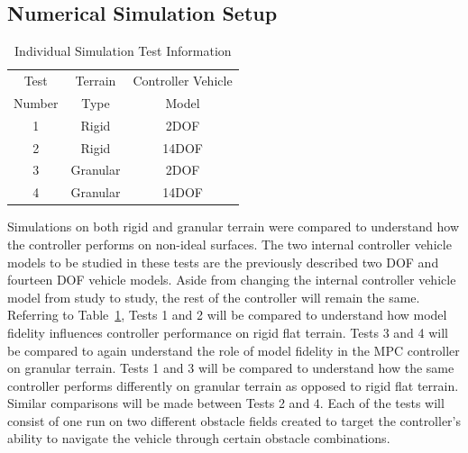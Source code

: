 \documentclass[12pt,twocolumn]{article}
\begin{document}

\subsection{Numerical Simulation Setup }\label{ss:Setup}

\begin{table}
\begin{center}
	\begin{tabular}{||c |c | c||} 
		\hline
		Test  & Terrain  & Controller Vehicle \\
		Number &  Type & Model\\ [0.5ex] 	
		\hline\hline
		1 & Rigid & 2DOF \\ 
		\hline
		2 & Rigid & 14DOF \\
		\hline
		3 & Granular & 2DOF \\
		\hline
		4 & Granular & 14DOF \\
		\hline
	\end{tabular}
\end{center}
\caption{Individual Simulation Test Information}
\label{t:TestMatrix}
\end{table}

Simulations on both rigid and granular terrain were compared to understand how the controller performs on non-ideal surfaces.  The two internal controller vehicle models to be studied in these tests are the previously described two DOF and fourteen DOF vehicle models. Aside from changing the internal controller vehicle model from study to study, the rest of the controller will remain the same. Referring to Table~\ref{t:TestMatrix}, Tests 1 and 2 will be compared to understand how model fidelity influences controller performance on rigid flat terrain. Tests 3 and 4 will be compared to again understand the role of model fidelity in the MPC controller on granular terrain. Tests 1 and 3 will be compared to understand how the same controller performs differently on granular terrain as opposed to rigid flat terrain. Similar comparisons will be made between Tests 2 and 4. Each of the tests will consist of one run on two different obstacle fields created to target the controller’s ability to navigate the vehicle through certain obstacle combinations.
\end{document}
